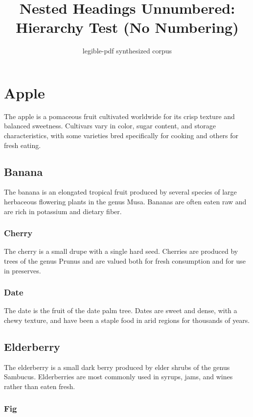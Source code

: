 \documentclass[12pt]{article}
\title{Nested Headings Unnumbered: Hierarchy Test (No Numbering)}
\author{legible-pdf synthesized corpus}
\date{}
\begin{document}
\maketitle

\section{Apple}

The apple is a pomaceous fruit cultivated worldwide for its crisp texture
and balanced sweetness. Cultivars vary in color, sugar content, and storage
characteristics, with some varieties bred specifically for cooking and
others for fresh eating.

\subsection{Banana}

The banana is an elongated tropical fruit produced by several species of
large herbaceous flowering plants in the genus Musa. Bananas are often eaten
raw and are rich in potassium and dietary fiber.

\subsubsection{Cherry}

The cherry is a small drupe with a single hard seed. Cherries are produced
by trees of the genus Prunus and are valued both for fresh consumption and
for use in preserves.

\subsubsection{Date}

The date is the fruit of the date palm tree. Dates are sweet and dense, with
a chewy texture, and have been a staple food in arid regions for thousands
of years.

\subsection{Elderberry}

The elderberry is a small dark berry produced by elder shrubs of the genus
Sambucus. Elderberries are most commonly used in syrups, jams, and wines
rather than eaten fresh.

\subsubsection{Fig}
\end{document}
